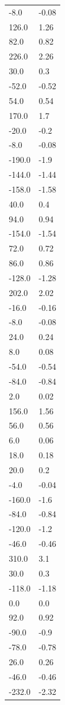 \begin{longtable}{ll}
-8.0 & -0.08 \\
126.0 & 1.26 \\
82.0 & 0.82 \\
226.0 & 2.26 \\
30.0 & 0.3 \\
-52.0 & -0.52 \\
54.0 & 0.54 \\
170.0 & 1.7 \\
-20.0 & -0.2 \\
-8.0 & -0.08 \\
-190.0 & -1.9 \\
-144.0 & -1.44 \\
-158.0 & -1.58 \\
40.0 & 0.4 \\
94.0 & 0.94 \\
-154.0 & -1.54 \\
72.0 & 0.72 \\
86.0 & 0.86 \\
-128.0 & -1.28 \\
202.0 & 2.02 \\
-16.0 & -0.16 \\
-8.0 & -0.08 \\
24.0 & 0.24 \\
8.0 & 0.08 \\
-54.0 & -0.54 \\
-84.0 & -0.84 \\
2.0 & 0.02 \\
156.0 & 1.56 \\
56.0 & 0.56 \\
6.0 & 0.06 \\
18.0 & 0.18 \\
20.0 & 0.2 \\
-4.0 & -0.04 \\
-160.0 & -1.6 \\
-84.0 & -0.84 \\
-120.0 & -1.2 \\
-46.0 & -0.46 \\
310.0 & 3.1 \\
30.0 & 0.3 \\
-118.0 & -1.18 \\
0.0 & 0.0 \\
92.0 & 0.92 \\
-90.0 & -0.9 \\
-78.0 & -0.78 \\
26.0 & 0.26 \\
-46.0 & -0.46 \\
-232.0 & -2.32 \\

\end{longtable}
